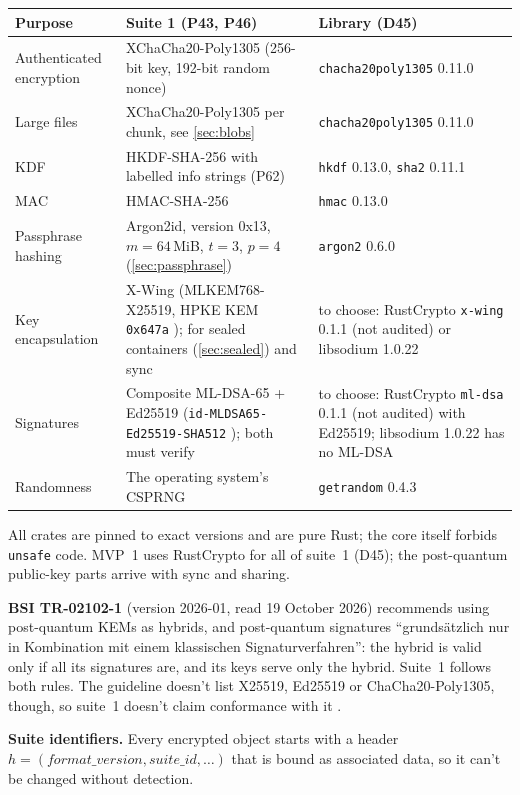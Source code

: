 \documentclass[11pt,a4paper]{article}
\newcommand{\dref}[1]{\textsf{#1}} %
\begin{document}
\begin{tabularx}{\textwidth}{@{}lXl@{}}
\toprule
Purpose & Suite 1 (\dref{P43}, \dref{P46}) & Library (\dref{D45}) \\
\midrule
Authenticated encryption & XChaCha20-Poly1305 (256-bit key, 192-bit random nonce) & \texttt{chacha20poly1305} 0.11.0 \\
Large files & XChaCha20-Poly1305 per chunk, see \cref{sec:blobs} & \texttt{chacha20poly1305} 0.11.0 \\
KDF & HKDF-SHA-256 \cite{rfc5869} with labelled info strings (\dref{P62}) & \texttt{hkdf} 0.13.0, \texttt{sha2} 0.11.1 \\
MAC & HMAC-SHA-256 \cite{rfc2104} & \texttt{hmac} 0.13.0 \\
Passphrase hashing & Argon2id, version 0x13, $m = 64$\,MiB, $t = 3$, $p = 4$ (\cref{sec:passphrase}) & \texttt{argon2} 0.6.0 \\
Key encapsulation & X-Wing (MLKEM768-X25519, HPKE KEM \texttt{0x647a} \cite{hpkepq}); for sealed containers (\cref{sec:sealed}) and sync & to choose: RustCrypto \texttt{x-wing} 0.1.1 (not audited) or libsodium 1.0.22 \\
Signatures & Composite ML-DSA-65 + Ed25519 (\texttt{id-MLDSA65-Ed25519-SHA512} \cite{compsig}); both must verify & to choose: RustCrypto \texttt{ml-dsa} 0.1.1 (not audited) with Ed25519; libsodium 1.0.22 has no ML-DSA \\
Randomness & The operating system's CSPRNG & \texttt{getrandom} 0.4.3 \\
\bottomrule
\end{tabularx}

\medskip
\noindent All crates are pinned to exact versions and are pure Rust; the core itself forbids \texttt{unsafe} code. MVP~1 uses RustCrypto for all of suite~1 (\dref{D45}); the post-quantum public-key parts arrive with sync and sharing.

\noindent\textbf{BSI TR-02102-1} (version 2026-01, read 19 October 2026) recommends using post-quantum KEMs as hybrids, and post-quantum signatures ``grundsätzlich nur in Kombination mit einem klassischen Signaturverfahren'': the hybrid is valid only if all its signatures are, and its keys serve only the hybrid. Suite~1 follows both rules. The guideline doesn't list X25519, Ed25519 or ChaCha20-Poly1305, though, so suite~1 doesn't claim conformance with it \cite{bsi}.

\noindent\textbf{Suite identifiers.} Every encrypted object starts with a header $h = (\mathit{format\_version}, \mathit{suite\_id}, \ldots)$ that is bound as associated data, so it can't be changed without detection.
\end{document}
